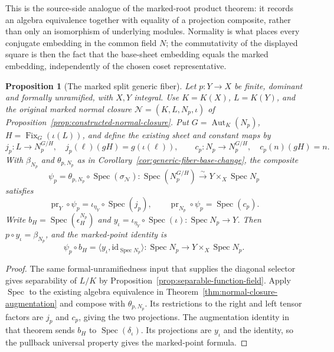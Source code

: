 \documentclass[11pt]{article}
\newtheorem{proposition}[theorem]{Proposition}
\theoremstyle{definition}
\theoremstyle{remark}
\DeclareMathOperator{\Spec}{Spec}
\begin{document}
This is the source-side analogue of the marked-root product theorem: it
records an algebra equivalence together with equality of a projection
composite, rather than only an isomorphism of underlying modules.  Normality
is what places every conjugate embedding in the common field \(N\); the
commutativity of the displayed square is then the fact that the base-sheet
embedding equals the marked embedding, independently of the chosen coset representative.

\begin{proposition}[The marked split generic fiber]
\label{prop:marked-split-generic-fiber}
Let \(p:Y\to X\) be finite, dominant and formally unramified, with
\(X,Y\) integral. Use \(K=K(X)\), \(L=K(Y)\), and the original
marked normal closure \(\mathcal N=(K,L,N_p,\iota)\) of
Proposition~\ref{prop:constructed-normal-closure}. Put
\(G=\operatorname{Aut}_K(N_p)\), \(H=\operatorname{Fix}_G(\iota(L))\),
and define the existing sheet and constant maps by
\[
 j_p:L\longrightarrow N_p^{G/H},\quad j_p(\ell)(gH)=g(\iota(\ell)),
 \qquad
 c_p:N_p\longrightarrow N_p^{G/H},\quad c_p(n)(gH)=n.
\]
With \(\beta_{N_p}\) and \(\theta_{p,N_p}\) as in
Corollary~\ref{cor:generic-fiber-base-change}, the composite
\[
 \psi_p=\theta_{p,N_p}\circ\Spec(\sigma_{\mathcal N}):
 \Spec(N_p^{G/H})\xrightarrow{\sim}Y\times_X\Spec N_p
\]
satisfies
\[
 \operatorname{pr}_Y\circ\psi_p
   =\iota_{\eta_Y}\circ\Spec(j_p),\qquad
 \operatorname{pr}_{N_p}\circ\psi_p=\Spec(c_p).
\]
Write \(b_H=\Spec(\epsilon_H^{N_p})\) and
\(y_\iota=\iota_{\eta_Y}\circ\Spec(\iota):\Spec N_p\to Y\).
Then \(p\circ y_\iota=\beta_{N_p}\), and the marked-point identity is
\[
 \psi_p\circ b_H
   =\langle y_\iota,\mathrm{id}_{\Spec N_p}\rangle:
       \Spec N_p\longrightarrow Y\times_X\Spec N_p.
\]
\end{proposition}

\begin{proof}
The same formal-unramifiedness input that supplies the diagonal selector
gives separability of \(L/K\) by
Proposition~\ref{prop:separable-function-field}.
Apply \(\Spec\) to the existing algebra equivalence in
Theorem~\ref{thm:normal-closure-augmentation} and compose with
\(\theta_{p,N_p}\). Its restrictions to the right and left tensor
factors are \(j_p\) and \(c_p\), giving the two projections.
The augmentation identity in that theorem sends \(b_H\) to
\(\Spec(\delta_\iota)\). Its projections are \(y_\iota\) and the
identity, so the pullback universal property gives the marked-point formula.
\end{proof}
\end{document}
